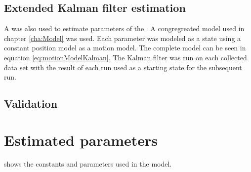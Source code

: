 \subsection{Extended Kalman filter estimation}
A \abbEKF was also used to estimate parameters of the \abbROV. A congregreated model used in chapter \ref{cha:Model} was used. Each parameter was modeled as a state using a constant position model as a motion model. The complete model can be seen in equation \ref{eq:motionModelKalman}. The Kalman filter was run on each collected data set with the result of each run used as a starting state for the subsequent run.  
\begin{equation}
\end{equation}




\subsection{Validation}
\section{Estimated parameters}
 shows the constants and parameters used in the \abbrROV model.

